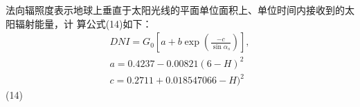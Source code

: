 法向辐照度表示地球上垂直于太阳光线的平面单位面积上、单位时间内接收到的太阳辐射能量，计
算公式(14)如下：
$$
\begin{array}{c}{{D N I=G_{0}\left[a+b\exp\left(\frac{-c}{\sin\alpha_{s}}\right)\right],}}\\ {{a=0.4237-0.00821(6-H)^{2}}}\\ {{c=0.2711+0.018547066-H)^{2}}}\end{array}
$$
(14)